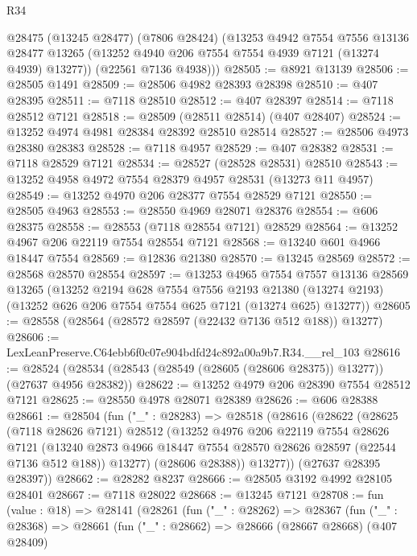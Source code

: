 \begin{lexlean}{R34}
\begin{coremodule}
      @28475
        (@13245 @28477)
        (@7806 @28424)
        (@13253
          @4942
          @7554
          @7556
          @13136
          @28477
          @13265
          (@13252 @4940 @206 @7554 @7554 @4939 @7121 (@13274 @4939) @13277))
        (@22561 @7136 @4938)))
@28505 := @8921 @13139
@28506 := @28505 @1491
@28509 := @28506 @4982 @28393 @28398
@28510 := @407 @28395
@28511 := @7118 @28510
@28512 := @407 @28397
@28514 := @7118 @28512 @7121
@28518 := @28509 (@28511 @28514) (@407 @28407)
@28524 := @13252 @4974 @4981 @28384 @28392 @28510 @28514
@28527 := @28506 @4973 @28380 @28383
@28528 := @7118 @4957
@28529 := @407 @28382
@28531 := @7118 @28529 @7121
@28534 := @28527 (@28528 @28531) @28510
@28543 := @13252 @4958 @4972 @7554 @28379 @4957 @28531 (@13273 @11 @4957)
@28549 := @13252 @4970 @206 @28377 @7554 @28529 @7121
@28550 := @28505 @4963
@28553 := @28550 @4969 @28071 @28376
@28554 := @606 @28375
@28558 := @28553 (@7118 @28554 @7121) @28529
@28564 := @13252 @4967 @206 @22119 @7554 @28554 @7121
@28568 := @13240 @601 @4966 @18447 @7554
@28569 := @12836 @21380
@28570 := @13245 @28569
@28572 := @28568 @28570 @28554
@28597 := @13253
    @4965
    @7554
    @7557
    @13136
    @28569
    @13265
    (@13252
      @2194
      @628
      @7554
      @7556
      @2193
      @21380
      (@13274 @2193)
      (@13252 @626 @206 @7554 @7554 @625 @7121 (@13274 @625) @13277))
@28605 := @28558 (@28564 (@28572 @28597 (@22432 @7136 @512 @188)) @13277)
@28606 := LexLeanPreserve.C64ebb6f0c07e904bdfd24c892a00a9b7.R34.__rel_103
@28616 := @28524 (@28534 (@28543 (@28549 (@28605 (@28606 @28375)) @13277)) (@27637 @4956 @28382))
@28622 := @13252 @4979 @206 @28390 @7554 @28512 @7121
@28625 := @28550 @4978 @28071 @28389
@28626 := @606 @28388
@28661 := @28504
    (fun ("_" : @28283) =>
    @28518
      (@28616
        (@28622
          (@28625
            (@7118 @28626 @7121)
            @28512
            (@13252
              @4976
              @206
              @22119
              @7554
              @28626
              @7121
              (@13240 @2873 @4966 @18447 @7554 @28570 @28626 @28597 (@22544 @7136 @512 @188))
              @13277)
            (@28606 @28388))
          @13277))
      (@27637 @28395 @28397))
@28662 := @28282 @8237
@28666 := @28505 @3192 @4992 @28105 @28401
@28667 := @7118 @28022
@28668 := @13245 @7121
@28708 := fun (value : @18) =>
  @28141
    (@28261
      (fun ("_" : @28262) =>
      @28367
        (fun ("_" : @28368) =>
        @28661
          (fun ("_" : @28662) =>
          @28666
            (@28667 @28668)
            (@407 @28409)

\end{coremodule}
\end{lexlean}

